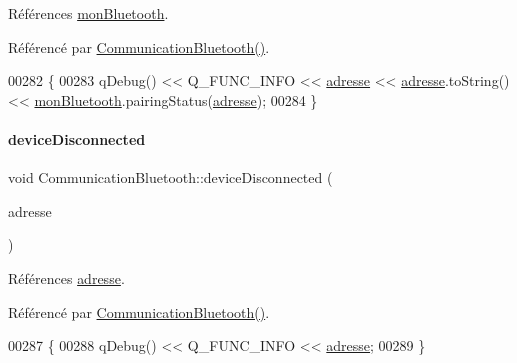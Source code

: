 Références \hyperlink{class_communication_bluetooth_abc0a9f1ce7a055021027ebc841154c9c}{mon\+Bluetooth}.



Référencé par \hyperlink{class_communication_bluetooth_aa759c75b0df7f7e237eec495f156bba0}{Communication\+Bluetooth()}.


\begin{DoxyCode}
00282 \{
00283     qDebug() << Q\_FUNC\_INFO << \hyperlink{class_communication_bluetooth_a20fd97fb70e36e0dfb8dadcc25484302}{adresse} << \hyperlink{class_communication_bluetooth_a20fd97fb70e36e0dfb8dadcc25484302}{adresse}.toString() << 
      \hyperlink{class_communication_bluetooth_abc0a9f1ce7a055021027ebc841154c9c}{monBluetooth}.pairingStatus(\hyperlink{class_communication_bluetooth_a20fd97fb70e36e0dfb8dadcc25484302}{adresse});
00284 \}
\end{DoxyCode}
\mbox{\label{class_communication_bluetooth_aaaeaea386c629e980580072f7221b9f0}} 
\paragraph{\texorpdfstring{device\+Disconnected}{deviceDisconnected}}
{\footnotesize\ttfamily void Communication\+Bluetooth\+::device\+Disconnected (\begin{DoxyParamCaption}\item[{const Q\+Bluetooth\+Address \&}]{adresse }\end{DoxyParamCaption})\hspace{0.3cm}{\ttfamily [slot]}}



Références \hyperlink{class_communication_bluetooth_a20fd97fb70e36e0dfb8dadcc25484302}{adresse}.



Référencé par \hyperlink{class_communication_bluetooth_aa759c75b0df7f7e237eec495f156bba0}{Communication\+Bluetooth()}.


\begin{DoxyCode}
00287 \{
00288     qDebug() << Q\_FUNC\_INFO << \hyperlink{class_communication_bluetooth_a20fd97fb70e36e0dfb8dadcc25484302}{adresse};
00289 \}
\end{DoxyCode}
\mbox{\label{class_communication_bluetooth_a580660d99ee817b993fc5bd1ec9d973f}} 
